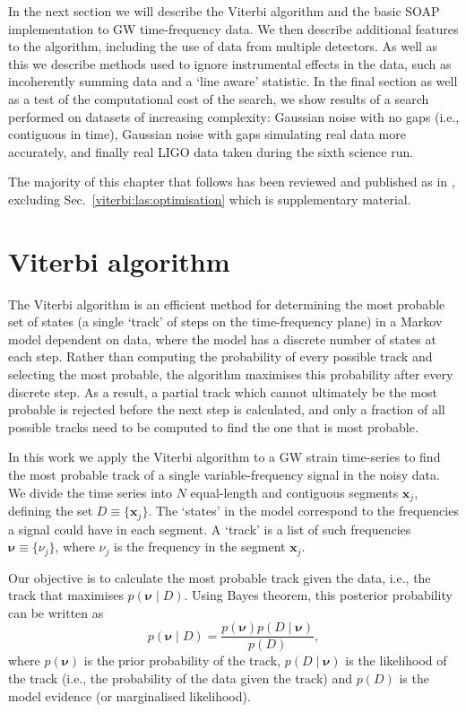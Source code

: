 %
%
In the next section we will describe the Viterbi algorithm and the basic SOAP implementation to \ac{GW} time-frequency data. We then describe additional features to the algorithm, including the use of data from multiple detectors. As well as this we describe methods used to ignore instrumental effects in the data, such as incoherently summing data and a `line aware' statistic. In the final section as well as a test of the computational cost of the search, we show results of a search performed on datasets of increasing complexity: Gaussian noise with no gaps (i.e., contiguous in time), Gaussian noise with gaps simulating real data more accurately, and finally real \ac{LIGO} data taken during the sixth science run. 

The majority of this chapter that follows has been reviewed and published as in \cite{Bayley2019}, excluding Sec.~\ref{viterbi:las:optimisation} which is supplementary material.

\section{Viterbi algorithm}
%
%
The Viterbi algorithm is an efficient method for determining the most probable set of states (a single `track' of steps on the time-frequency plane) in a Markov model dependent on data, where the model has a discrete number of states at each step. Rather than computing the probability of every possible track and selecting the most probable, the algorithm maximises this probability after every discrete step. As a result, a partial track which cannot ultimately be the most probable is rejected before the next step is calculated, and only a fraction of all possible tracks need to be computed to find the one that is most probable.

%
%
In this work we apply the Viterbi algorithm to a \ac{GW} strain time-series to find the most probable track of a single variable-frequency signal in the noisy data.  We divide the time series into $N$ equal-length and contiguous segments ${\bm x}_j$,  defining the set $D \equiv \{{\bm x}_j\}$. The `states' in the model correspond to the frequencies a signal could have in each segment. A `track' is a list of such frequencies ${\bm \nu}\equiv \{\nu_j\}$, where  $\nu_j$ is the frequency in the segment ${\bm x_j}$.

%
%
Our objective is to calculate the most probable track given the data, i.e., the
track that maximises $p({\bm \nu}\mid D)$. Using Bayes theorem, this posterior probability can
be written as
%
\begin{equation}
\label{viterbi:bayes}
  p({\bm \nu} \mid D) = \frac{p({\bm \nu})p(D \mid {\bm \nu})}{p(D)},
\end{equation}
%
where $p({\bm \nu}) $ is the prior probability of the
track, $p(D \mid{\bm \nu})$ is the likelihood of the track (i.e., the
probability of the data given the track) and $p(D)$ is the model evidence (or
marginalised likelihood).

